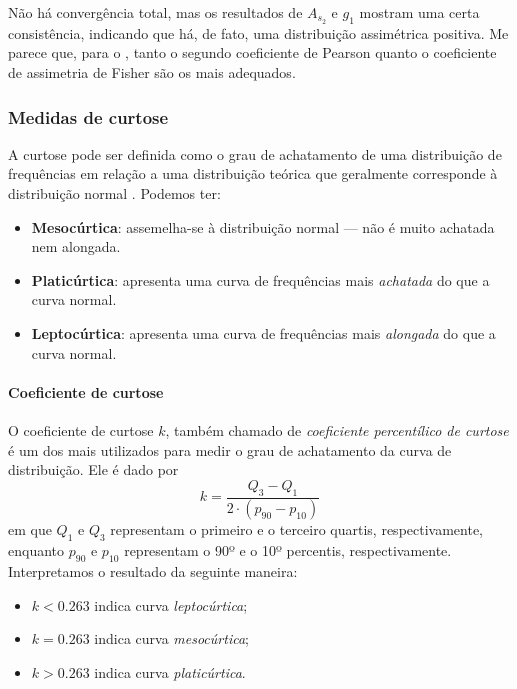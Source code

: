 Não há convergência total, mas os resultados de $A_{s_2}$ e $g_1$ mostram uma
certa consistência, indicando que há, de fato, uma distribuição assimétrica
positiva. Me parece que, para o , tanto o segundo
coeficiente de Pearson quanto o coeficiente de assimetria de Fisher são os mais
adequados. 

\subsubsection{Medidas de curtose}

A curtose pode ser definida como o grau de achatamento de uma distribuição de
frequências em relação a uma distribuição teórica que geralmente corresponde à
distribuição normal \parencite[p.~166]{favero}. Podemos ter:
\begin{itemize}
    \item \textbf{Mesocúrtica}: assemelha-se à distribuição normal --- não é
    muito achatada nem alongada.
    \item \textbf{Platicúrtica}: apresenta uma curva de frequências mais
    \emph{achatada} do que a curva normal.
    \item \textbf{Leptocúrtica}: apresenta uma curva de frequências mais
    \emph{alongada} do que a curva normal.
\end{itemize}

\paragraph{Coeficiente de curtose}
O coeficiente de curtose $k$, também chamado de \emph{coeficiente
percentílico de curtose} é um dos mais utilizados para medir o grau de
achatamento da curva de distribuição. Ele é dado por
\begin{equation}
    k = \frac{Q_3-Q_1}{2 \cdot (p_{90}-p_{10})}
    \label{eq:coef-curtose}
\end{equation}
em que $Q_1$ e $Q_3$ representam o primeiro e o terceiro quartis,
respectivamente, enquanto $p_{90}$ e $p_{10}$ representam o 90º e o 10º
percentis, respectivamente. Interpretamos o resultado da seguinte maneira:
\begin{itemize}
    \item $k<0.263$ indica curva \emph{leptocúrtica};
    \item $k=0.263$ indica curva \emph{mesocúrtica};
    \item $k>0.263$ indica curva \emph{platicúrtica}.
\end{itemize}

